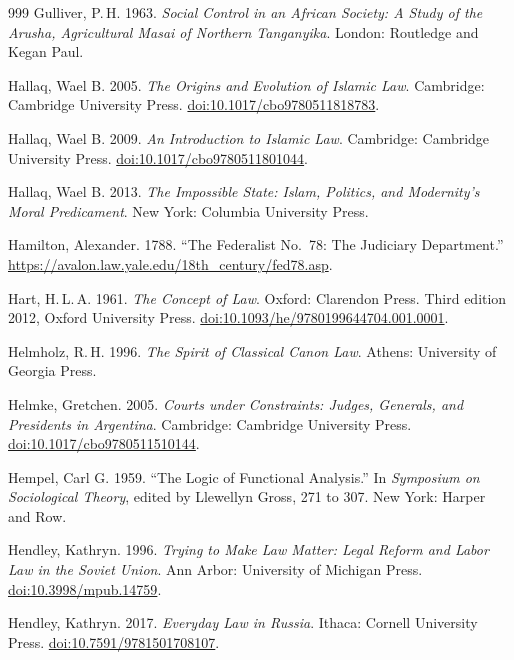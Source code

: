 \documentclass[11pt,letterpaper]{article}
\theoremstyle{definition}
\theoremstyle{remark}
\begin{document}
\begin{thebibliography}{999}
Gulliver, P.\,H. 1963. \emph{Social Control in an African Society: A Study of the Arusha, Agricultural Masai of Northern Tanganyika}. London: Routledge and Kegan Paul.

Hallaq, Wael B. 2005. \emph{The Origins and Evolution of Islamic Law}. Cambridge: Cambridge University Press. \href{https://doi.org/10.1017/cbo9780511818783}{doi:10.1017/cbo9780511818783}.

Hallaq, Wael B. 2009. \emph{An Introduction to Islamic Law}. Cambridge: Cambridge University Press. \href{https://doi.org/10.1017/cbo9780511801044}{doi:10.1017/cbo9780511801044}.

Hallaq, Wael B. 2013. \emph{The Impossible State: Islam, Politics, and Modernity's Moral Predicament}. New York: Columbia University Press.

Hamilton, Alexander. 1788. ``The Federalist No.~78: The Judiciary Department.'' \url{https://avalon.law.yale.edu/18th_century/fed78.asp}.

Hart, H.\,L.\,A. 1961. \emph{The Concept of Law}. Oxford: Clarendon Press. Third edition 2012, Oxford University Press. \href{https://doi.org/10.1093/he/9780199644704.001.0001}{doi:10.1093/he/9780199644704.001.0001}.

Helmholz, R.\,H. 1996. \emph{The Spirit of Classical Canon Law}. Athens: University of Georgia Press.

Helmke, Gretchen. 2005. \emph{Courts under Constraints: Judges, Generals, and Presidents in Argentina}. Cambridge: Cambridge University Press. \href{https://doi.org/10.1017/cbo9780511510144}{doi:10.1017/cbo9780511510144}.

Hempel, Carl G. 1959. ``The Logic of Functional Analysis.'' In \emph{Symposium on Sociological Theory}, edited by Llewellyn Gross, 271 to 307. New York: Harper and Row.

Hendley, Kathryn. 1996. \emph{Trying to Make Law Matter: Legal Reform and Labor Law in the Soviet Union}. Ann Arbor: University of Michigan Press. \href{https://doi.org/10.3998/mpub.14759}{doi:10.3998/mpub.14759}.

Hendley, Kathryn. 2017. \emph{Everyday Law in Russia}. Ithaca: Cornell University Press. \href{https://doi.org/10.7591/9781501708107}{doi:10.7591/9781501708107}.


\end{thebibliography}
\end{document}
